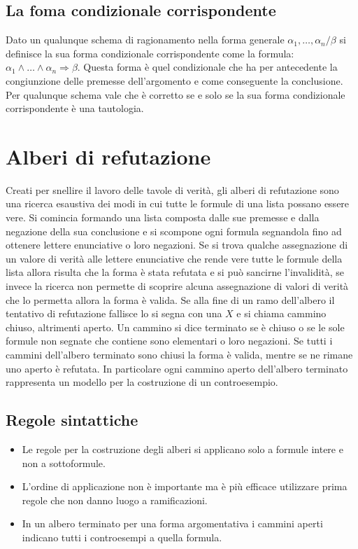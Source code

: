 \subsection{La foma condizionale corrispondente}
Dato un qualunque schema di ragionamento nella forma generale $\alpha_1,\dots, \alpha_n/\beta$ si definisce la sua forma condizionale corrispondente come la formula: $\alpha_1\land\dots\land 
\alpha_n\Rightarrow\beta$. Questa forma \`e quel condizionale che ha per antecedente la congiunzione delle premesse dell'argomento e come conseguente la conclusione. Per qualunque schema vale che \`e 
corretto se e solo se la sua forma condizionale corrispondente \`e una tautologia. 
\section{Alberi di refutazione}
Creati per snellire il lavoro delle tavole di verit\`a, gli alberi di refutazione sono una ricerca esaustiva dei modi in cui tutte le formule di una lista possano essere vere. Si comincia formando una lista composta 
dalle sue premesse e dalla negazione della sua conclusione e si scompone ogni formula segnandola fino ad ottenere lettere enunciative o loro negazioni. Se si trova qualche assegnazione di un valore di verit\`a 
alle lettere enunciative che rende vere tutte le formule della lista allora risulta che la forma \`e stata refutata e si pu\`o sancirne l'invalidit\`a, se invece la ricerca non permette di scoprire alcuna assegnazione di 
valori di verit\`a che lo permetta allora la forma \`e valida. Se alla fine di un ramo dell'albero il tentativo di refutazione fallisce lo si segna con una $X$ e si chiama cammino chiuso, altrimenti aperto. Un cammino 
si dice terminato se \`e chiuso o se le sole formule non segnate che contiene sono elementari o loro negazioni. Se tutti i cammini dell'albero terminato sono chiusi la forma \`e valida, mentre se ne rimane uno 
aperto \`e refutata. In particolare ogni cammino aperto dell'albero terminato rappresenta un modello per la costruzione di un controesempio. 
\subsection{Regole sintattiche}
\begin{itemize}
\item Le regole per la costruzione degli alberi si applicano solo a formule intere e non a sottoformule.
\item L'ordine di applicazione non \`e importante ma \`e pi\`u efficace utilizzare prima regole che non danno luogo a ramificazioni. 
\item In un albero terminato per una forma argomentativa i cammini aperti indicano tutti i controesempi a quella formula. 
\end{itemize}
